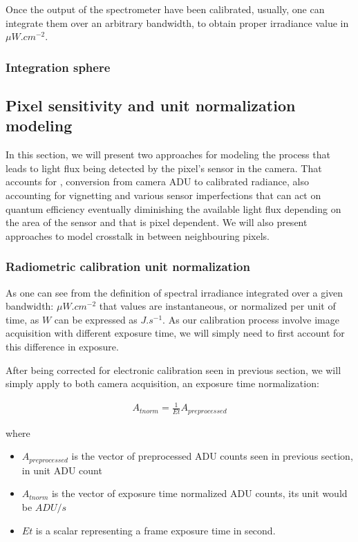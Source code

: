 \documentclass{article}
\begin{document}
    Once the output of the spectrometer have been calibrated, usually, one can integrate them over an arbitrary bandwidth, to obtain proper irradiance value in $\mu W . cm^{-2}$.
    
    \subsubsection{Integration sphere}

  \subsection{Pixel sensitivity and unit normalization modeling}
    In this section, we will present two approaches for modeling the process that leads to light flux being detected by the pixel's sensor in the camera. That accounts for , conversion from camera ADU to calibrated radiance, also accounting for vignetting and various sensor imperfections that can act on quantum efficiency eventually diminishing the available light flux depending on the area of the sensor and that is pixel dependent. We will also present approaches to model crosstalk in between neighbouring pixels.
    
    \subsubsection{Radiometric calibration unit normalization}
    As one can see from the definition of spectral irradiance integrated over a given bandwidth: $\mu W . cm^{-2}$ that values are instantaneous, or normalized per unit of time, as $W$ can be expressed as $J . s^{-1}$. As our calibration process involve image acquisition with different exposure time, we will simply need to first account for this difference in exposure.
    
    After being corrected for electronic calibration seen in previous section, we will simply apply to both camera acquisition, an exposure time normalization:
    
    \begin{align*}
     A_{tnorm} = \frac{1}{Et} A_{preprocessed} 
    \end{align*}

    where
    \begin{itemize}
     \item $A_{preprocessed}$ is the vector of preprocessed ADU counts seen in previous section, in unit ADU count
     \item $A_{tnorm}$ is the vector of exposure time normalized ADU counts, its unit would be $ADU/s$
     \item $Et$ is a scalar representing a frame exposure time in second.
    \end{itemize}
\end{document}
